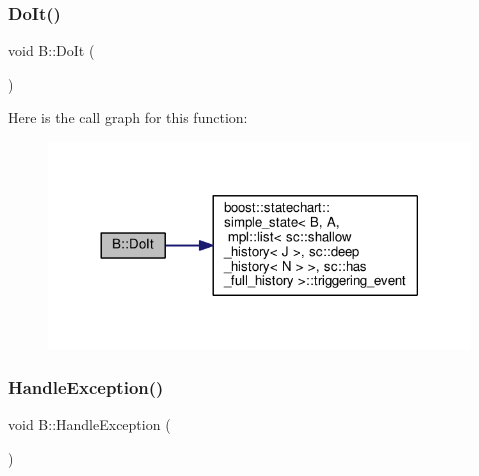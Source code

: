 \subsubsection{\texorpdfstring{Do\+It()}{DoIt()}}
{\footnotesize\ttfamily void B\+::\+Do\+It (\begin{DoxyParamCaption}\item[{const \mbox{\hyperlink{struct_ev_do_it}{Ev\+Do\+It}} \&}]{ }\end{DoxyParamCaption})\hspace{0.3cm}{\ttfamily [inline]}}

Here is the call graph for this function\+:
\nopagebreak
\begin{figure}[H]
\begin{center}
\leavevmode
\includegraphics[width=317pt]{struct_b_ad8417b0b86326962007c13d75094330e_cgraph}
\end{center}
\end{figure}
\mbox{\label{struct_b_a8eb80df2fcfde5209e4800f5aec2d7a5}} 
\subsubsection{\texorpdfstring{Handle\+Exception()}{HandleException()}}
{\footnotesize\ttfamily void B\+::\+Handle\+Exception (\begin{DoxyParamCaption}\item[{const \mbox{\hyperlink{classboost_1_1statechart_1_1exception__thrown}{sc\+::exception\+\_\+thrown}} \&}]{ }\end{DoxyParamCaption})\hspace{0.3cm}{\ttfamily [inline]}}

